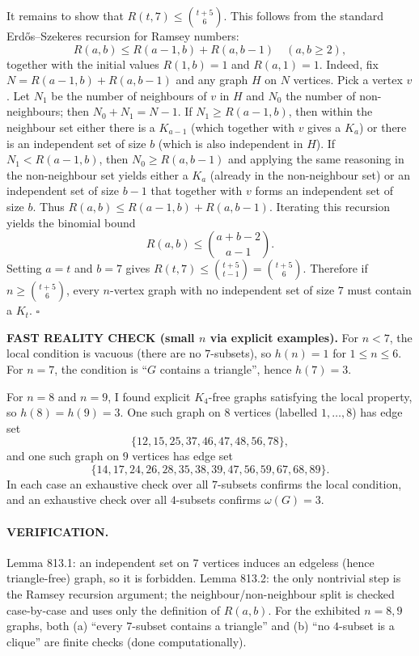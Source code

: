 It remains to show that $R(t,7)\le \binom{t+5}{6}$.
This follows from the standard Erd\H{o}s--Szekeres recursion for Ramsey numbers:
\[
R(a,b) \le R(a-1,b) + R(a,b-1)\quad (a,b\ge2),
\]
together with the initial values $R(1,b)=1$ and $R(a,1)=1$.
Indeed, fix $N=R(a-1,b)+R(a,b-1)$ and any graph $H$ on $N$ vertices.
Pick a vertex $v$. Let $N_1$ be the number of neighbours of $v$ in $H$ and $N_0$ the number of non-neighbours; then $N_0+N_1=N-1$.
If $N_1\ge R(a-1,b)$, then within the neighbour set either there is a $K_{a-1}$ (which together with $v$ gives a $K_a$) or there is an independent set of size $b$ (which is also independent in $H$).
If $N_1< R(a-1,b)$, then $N_0\ge R(a,b-1)$ and applying the same reasoning in the non-neighbour set yields either a $K_a$ (already in the non-neighbour set) or an independent set of size $b-1$ that together with $v$ forms an independent set of size $b$.
Thus $R(a,b)\le R(a-1,b)+R(a,b-1)$.
Iterating this recursion yields the binomial bound
\[
R(a,b) \le \binom{a+b-2}{a-1}.
\]
Setting $a=t$ and $b=7$ gives $R(t,7)\le \binom{t+5}{t-1}=\binom{t+5}{6}$.
Therefore if $n\ge \binom{t+5}{6}$, every $n$-vertex graph with no independent set of size $7$ must contain a $K_t$.
\hfill $\square$

\textbf{FAST REALITY CHECK (small $n$ via explicit examples).}
For $n<7$, the local condition is vacuous (there are no $7$-subsets), so $h(n)=1$ for $1\le n\le 6$.
For $n=7$, the condition is ``$G$ contains a triangle'', hence $h(7)=3$.

For $n=8$ and $n=9$, I found explicit $K_4$-free graphs satisfying the local property, so $h(8)=h(9)=3$.
One such graph on $8$ vertices (labelled $1,\dots,8$) has edge set
\[
\{12,15,25,37,46,47,48,56,78\},
\]
and one such graph on $9$ vertices has edge set
\[
\{14,17,24,26,28,35,38,39,47,56,59,67,68,89\}.
\]
In each case an exhaustive check over all $7$-subsets confirms the local condition, and an exhaustive check over all $4$-subsets confirms $\omega(G)=3$.

\paragraph{VERIFICATION.}
Lemma 813.1: an independent set on $7$ vertices induces an edgeless (hence triangle-free) graph, so it is forbidden.
Lemma 813.2: the only nontrivial step is the Ramsey recursion argument; the neighbour/non-neighbour split is checked case-by-case and uses only the definition of $R(a,b)$.
For the exhibited $n=8,9$ graphs, both (a) ``every $7$-subset contains a triangle'' and (b) ``no $4$-subset is a clique'' are finite checks (done computationally).

